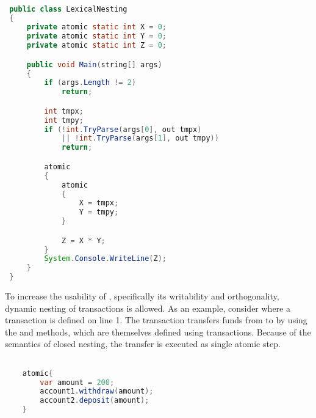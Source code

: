 \begin{lstlisting}[label=lst:stm_syntax_lexical_nesting,
 caption={Lexical Nesting},
 language=Java, 
 showspaces=false,
 showtabs=false,
 breaklines=true,
 showstringspaces=false,
 breakatwhitespace=true,
 commentstyle=\color{greencomments},
 keywordstyle=\color{bluekeywords},
 stringstyle=\color{redstrings},
 morekeywords={atomic, retry, orelse, var, get, set, using}]  % Start your code-block

 public class LexicalNesting
 {
     private atomic static int X = 0;
     private atomic static int Y = 0;
     private atomic static int Z = 0;

     public void Main(string[] args)
     {
         if (args.Length != 2)
             return;

         int tmpx;
         int tmpy;
         if (!int.TryParse(args[0], out tmpx)
             || !int.TryParse(args[1], out tmpy))
             return;

         atomic
         {
             atomic
             {
                 X = tmpx;
                 Y = tmpy;
             }

             Z = X * Y;
         }
         System.Console.WriteLine(Z);
     }
 }
\end{lstlisting}

To increase the usability of \stmname, specifically its writability and orthogonality, dynamic nesting of transactions is allowed. As an example, consider  where a transaction is defined on line 1. The transaction transfers funds from  to  by using the  and  methods, which are themselves defined using transactions. Because of the semantics of closed nesting, the transfer is executed as single atomic step.

\begin{lstlisting}[label=lst:stm_nested_transactions_real,
 caption={Dynamically nested transactions},
 language=Java, 
 showspaces=false,
 showtabs=false,
 breaklines=true,
 showstringspaces=false,
 breakatwhitespace=true,
 commentstyle=\color{greencomments},
 keywordstyle=\color{bluekeywords},
 stringstyle=\color{redstrings},
 morekeywords={atomic, retry, orElse, var}]  % Start your code-block

	atomic{
		var amount = 200;
		account1.withdraw(amount);
		account2.deposit(amount);
	}
     
\end{lstlisting}

